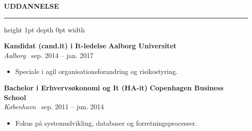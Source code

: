 \documentclass[10pt,a4paper]{article}
\newcommand{\cvsection}[1]{%
    \vspace{0.3cm}%
    {\color{primary}\large\bfseries\MakeUppercase{#1}}%
    \vspace{0.1cm}%
    \hrule height 1pt depth 0pt width \linewidth{\color{bordergray}}%
    \vspace{0.2cm}%
}
\newcommand{\cvitem}[4]{%
    \textbf{#1} \hfill {\color{secondary}\small\bfseries #2} \\{}%
    {\small\itshape #3} \hfill {\color{darktext}\scriptsize\faCalendar\ #4} \\{}%
    \vspace{0.05cm}%
}
\begin{document}
\begin{minipage}[t]{0.64\textwidth}
    \cvsection{Uddannelse}
    
    \cvitem{Kandidat (cand.it) i It-ledelse}{Aalborg Universitet}{Aalborg}{sep. 2014 -- jan. 2017}
    \begin{itemize}[leftmargin=*,nosep,label=\textcolor{secondary}{\tiny$\blacksquare$}]
        \item Speciale i agil organisationsforandring og risikostyring.
    \end{itemize}
    
    \vspace{0.25cm}
    \cvitem{Bachelor i Erhvervsøkonomi og It (HA-it)}{Copenhagen Business School}{København}{sep. 2011 -- jun. 2014}
    \begin{itemize}[leftmargin=*,nosep,label=\textcolor{secondary}{\tiny$\blacksquare$}]
        \item Fokus på systemudvikling, databaser og forretningsprocesser.
    \end{itemize}

\end{minipage}%
\hfill
\end{document}
